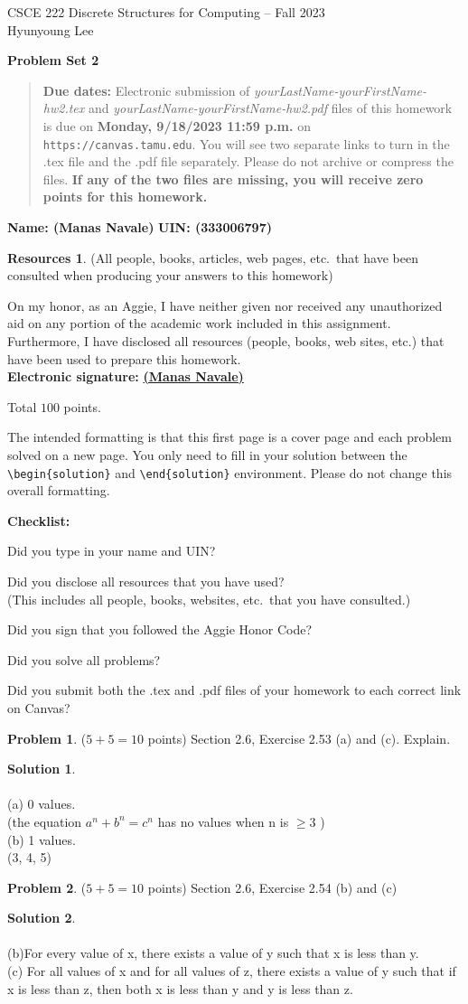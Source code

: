 \documentclass{article}
\theoremstyle{definition}
\newtheorem{problem}{Problem}
\newtheorem*{solution}{Solution}
\newtheorem*{resources}{Resources}
\newcommand{\name}[2]{\noindent\textbf{Name: #1}\hfill \textbf{UIN: #2}
  \newcommand{\myName}{#1}
  \newcommand{\myUIN}{#2}
}
\newcommand{\honor}{\noindent On my honor, as an Aggie, I have neither
  given nor received any unauthorized aid on any portion of the
  academic work included in this assignment. Furthermore, I have
  disclosed all resources (people, books, web sites, etc.) that have
  been used to prepare this homework. \\[2ex]
 \textbf{Electronic signature:} \underline{ \textbf{(Manas Navale)} } } %
\newcommand{\checklist}{\noindent\textbf{Checklist:}
\begin{compactitem}[$\Box$] 
\item Did you type in your name and UIN? 
\item Did you disclose all resources that you have used? \\
(This includes all people, books, websites, etc.\ that you have consulted.)
\item Did you sign that you followed the Aggie Honor Code? 
\item Did you solve all problems? 
\item Did you submit both the .tex and .pdf files of your homework to each correct link on Canvas? 
\end{compactitem}
}
\newcommand{\problemset}[1]{\begin{center}\textbf{Problem Set #1}\end{center}}
\newcommand{\duedate}[1]{\begin{quote}\textbf{Due dates:} Electronic
    submission of \textsl{yourLastName-yourFirstName-hw2.tex} and 
    \textsl{yourLastName-yourFirstName-hw2.pdf} files of this homework is due on
    \textbf{#1} on \texttt{https://canvas.tamu.edu}. You will see two separate links
    to turn in the .tex file and the .pdf file separately. Please do not archive or compress the files.  
    \textbf{If any of the two files are missing, you will receive zero points for this homework.}\end{quote} }
\begin{document}
\begin{center}
{\large
CSCE 222 Discrete Structures for Computing -- Fall 2023\\[.5ex]
Hyunyoung Lee\\}
\end{center}
\problemset{2}
\duedate{Monday, 9/18/2023 11:59 p.m.}
\name{ (Manas Navale) }{ (333006797) }  %

\begin{resources} (All people, books, articles, web pages, etc.\ that
  have been consulted when producing your answers to this homework)
\end{resources}
\honor

\bigskip

\noindent
Total $100$ points.

\bigskip

\noindent
The intended formatting is that this first page is a cover page and each 
problem solved on a new page. You only need to fill in your solution between 
the \verb|\begin{solution}| and \verb|\end{solution}| environment.  
Please do not change this overall formatting.

\vfill
\checklist

\newpage
\begin{problem} ($5+5=10$ points) Section 2.6, Exercise 2.53 (a) and (c). Explain.
\end{problem}
\begin{solution}
  ~\\
  ~\\
   (a) 0 values.
   \\(the equation $a^n+b^n = c^n$ has no values when n is $\geq 3$ )
   \\(b) 1 values.
   \\(3, 4, 5)
\end{solution}

\newpage
\begin{problem} ($5+5=10$ points) Section 2.6, Exercise 2.54 (b) and (c)
\end{problem}
\begin{solution} 
  ~\\
  ~\\
  (b)For every value of x, there exists a value of y such that x is less than y.
  \\(c) For all values of x and for all values of z, there exists a value of y such that if x is less than z, then both x is less than y and y is less than z.
\end{solution}
\end{document}
